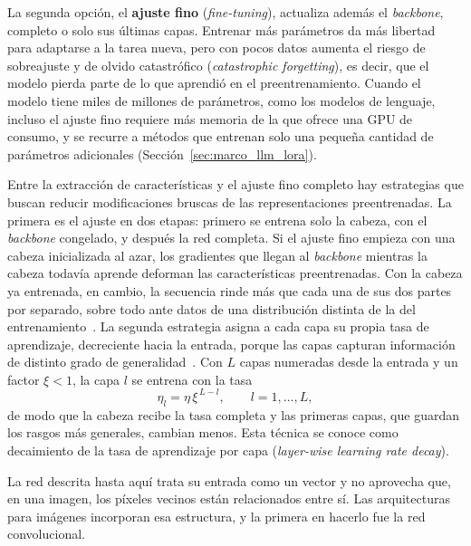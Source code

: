 La segunda opción, el \textbf{ajuste fino} (\emph{fine-tuning}), actualiza además el \emph{backbone}, completo o
solo sus últimas capas. Entrenar más parámetros da más libertad para adaptarse a la tarea nueva, pero con pocos
datos aumenta el riesgo de sobreajuste y de olvido catastrófico (\emph{catastrophic forgetting}), es decir, que
el modelo pierda parte de lo que aprendió en el preentrenamiento. Cuando el modelo tiene miles de millones de
parámetros, como los modelos de lenguaje, incluso el ajuste fino requiere más memoria de la que ofrece una GPU
de consumo, y se recurre a métodos que entrenan solo una pequeña cantidad de parámetros adicionales
(Sección~\ref{sec:marco_llm_lora}).

Entre la extracción de características y el ajuste fino completo hay estrategias que buscan reducir modificaciones bruscas de las representaciones preentrenadas. La primera es el ajuste en dos etapas: primero se entrena solo la cabeza, con el
\emph{backbone} congelado, y después la red completa. Si el ajuste fino empieza con una cabeza inicializada al
azar, los gradientes que llegan al \emph{backbone} mientras la cabeza todavía aprende deforman las
características preentrenadas. Con la cabeza ya entrenada, en cambio, la secuencia rinde más que cada una de sus
dos partes por separado, sobre todo ante datos de una distribución distinta de la del
entrenamiento~\cite{kumar2022finetuning}. La segunda estrategia asigna a cada capa su propia tasa de aprendizaje,
decreciente hacia la entrada, porque las capas capturan información de distinto grado de
generalidad~\cite{howard2018universal}. Con $L$ capas numeradas desde la entrada y un factor $\xi < 1$, la capa
$l$ se entrena con la tasa
\begin{equation}
    \eta_l = \eta \, \xi^{\,L-l}, \qquad l = 1, \dots, L,
    \label{eq:marco_llrd}
\end{equation}
de modo que la cabeza recibe la tasa completa y las primeras capas, que guardan los rasgos más generales,
cambian menos. Esta técnica se conoce como decaimiento de la tasa de aprendizaje por capa (\emph{layer-wise
learning rate decay}).

La red descrita hasta aquí trata su entrada como un vector y no aprovecha que, en una imagen, los píxeles
vecinos están relacionados entre sí. Las arquitecturas para imágenes incorporan esa estructura, y la primera en
hacerlo fue la red convolucional.

